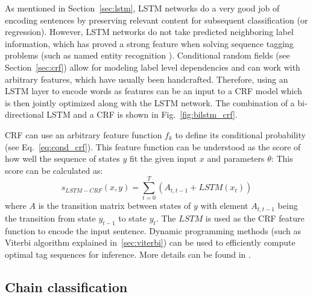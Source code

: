 As mentioned in Section~\ref{sec:lstm}, LSTM networks do a very good job of
encoding sentences by preserving relevant content for subsequent classification
(or regression).  However, LSTM networks do not take predicted neighboring
label information, which has proved a strong feature when solving sequence
tagging problems (such as named entity recognition \citep{nadeau2007survey}).
Conditional random fields (see Section~\ref{sec:crf}) allow for modeling label
level dependencies and can work with arbitrary features, which have usually
been handcrafted.
Therefore, using an LSTM layer to encode words as features can be an input to a
CRF model which is then jointly optimized along with the LSTM network.  
The combination of a bi-directional LSTM and a CRF is shown in Fig.~\ref{fig:bilstm_crf}.

CRF can use an arbitrary feature function $f_k$
to define its conditional probability (see Eq.~\ref{eq:cond_crf}).
This feature function can 
be understood as the score of how well the sequence 
of states $y$ fit the given input $x$ and parameters $\theta$:
This score can be calculated as:
$$
s_{\mathit{LSTM-CRF}}(x, y) = \sum_{t=0}^{T} \left( A_{\mathit{t, t-1}} + \mathit{LSTM}(x_t) \right)
$$
where $A$ is the transition matrix between states of $y$ with element $A_{t,
t-1}$ being the transition from state $y_{t-1}$ to state $y_{t}$. The $LSTM$ is
used as the CRF feature function to encode the input sentence.  Dynamic
programming methods (such as Viterbi algorithm explained in~\ref{sec:viterbi})
can be used to efficiently compute optimal tag sequences for inference. More
details can be found in \citep{huang2015bidirectional}.

\subsection{Chain classification}
\label{sec:chain_classification}

